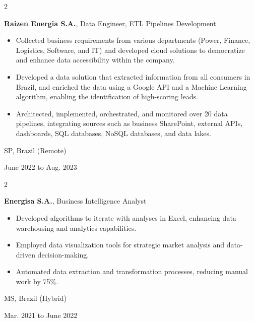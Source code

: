 \documentclass[10pt, letterpaper]{article}
\newenvironment{highlights}{
    \begin{itemize}[
        topsep=0.10 cm,
        parsep=0.10 cm,
        partopsep=0pt,
        itemsep=0pt,
        leftmargin=0.4 cm + 10pt
    ]
}{
    \end{itemize}
} %
\newenvironment{twocolentry}[2][]{
    \onecolentry
    \def\secondColumn{#2}
    \setcolumnwidth{\fill, 4.5 cm}
    \begin{paracol}{2}
}{
    \switchcolumn \raggedleft \secondColumn
    \end{paracol}
    \endonecolentry
} %
\begin{document}
        \vspace{0.2 cm}

        \begin{twocolentry}{
            SP, Brazil (Remote)

        June 2022 to Aug. 2023
        }
            \textbf{Raizen Energia S.A.}, Data Engineer, ETL Pipelines Development
            \begin{highlights}
                \item Collected business requirements from various departments (Power, Finance, Logistics, Software, and IT) and developed cloud solutions to democratize and enhance data accessibility within the company.
                \item Developed a data solution that extracted information from all consumers in Brazil, and enriched the data using a Google API and a Machine Learning algorithm, enabling the identification of high-scoring leads.
                \item Architected, implemented, orchestrated, and monitored over 20 data pipelines, integrating sources such as business SharePoint, external APIs, dashboards, SQL databases, NoSQL databases, and data lakes.
            \end{highlights}
        \end{twocolentry}


        \vspace{0.2 cm}

        \begin{twocolentry}{
            MS, Brazil (Hybrid)

        Mar. 2021 to June 2022
        }
            \textbf{Energisa S.A.}, Business Intelligence Analyst
            \begin{highlights}
                \item Developed algorithms to iterate with analyses in Excel, enhancing data warehousing and analytics capabilities.
                \item Employed data visualization tools for strategic market analysis and data-driven decision-making.
                \item Automated data extraction and transformation processes, reducing manual work by 75\%.
            \end{highlights}
        \end{twocolentry}


        \vspace{0.2 cm}
\end{document}

